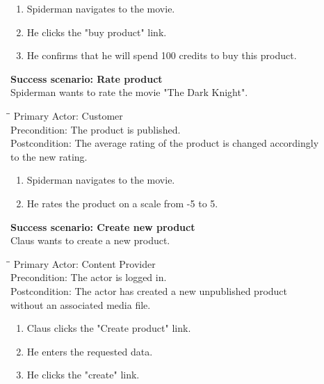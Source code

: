 \begin{enumerate} \setlength{\itemsep}{-1mm}
	\item Spiderman navigates to the movie.
	\item He clicks the "buy product" link.
	\item He confirms that he will spend 100 credits to buy this product.
\end{enumerate}
\vspace{3mm}
\textbf{Success scenario: Rate product} \\
Spiderman wants to rate the movie "The Dark Knight". 
\begin{tabbing}
\hspace{5mm}\=\hspace{26mm}\=\kill
\>Primary Actor:\> Customer\\
\>Precondition:\> The product is published.\\
\>Postcondition:\> The average rating of the product is changed accordingly\\ \hspace{85px} to the new rating.
\end{tabbing}
\begin{enumerate} \setlength{\itemsep}{-1mm}
	\item Spiderman navigates to the movie.
	\item He rates the product on a scale from -5 to 5.
\end{enumerate}
\vspace{3mm}
\textbf{Success scenario: Create new product} \\
Claus wants to create a new product. 
\begin{tabbing}
\hspace{5mm}\=\hspace{26mm}\=\kill
\>Primary Actor:\> Content Provider\\
\>Precondition:\> The actor is logged in.\\
\>Postcondition:\> The actor has created a new unpublished product\\ \hspace{85px} without an associated media file.
\end{tabbing}
\begin{enumerate} \setlength{\itemsep}{-1mm}
	\item Claus clicks the "Create product" link.
	\item He enters the requested data.
	\item He clicks the "create" link.
\end{enumerate}
